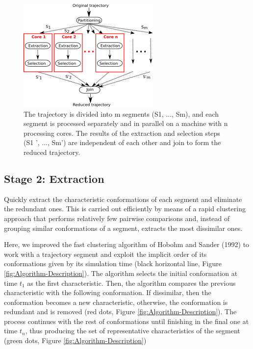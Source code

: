 \documentclass[american,twocolumn]{bmcart}
\begin{document}
\begin{figure}[th]
\begin{centering}
\includegraphics{images/algorithm-description-parallel}
\par\end{centering}
\caption{ The trajectory is divided into m segments (S1, ..., Sm), and each segment is processed separately and in parallel on a machine with n processing cores. The results of the extraction and selection steps (S1 ', ..., Sm') are independent of each other and join to form the reduced trajectory. \label{fig:Algorithm-Parallel}}
\end{figure}


\subsection*{Stage 2: Extraction}

Quickly extract the characteristic conformations of each segment and eliminate the redundant ones. This is carried out efficiently by means of a rapid clustering approach that performs relatively few pairwise comparisons and, instead of grouping similar conformations of a segment, extracts the most dissimilar ones.

Here, we improved the fast clustering algorithm of Hobohm and Sander (1992) to work with a trajectory segment and exploit the implicit order of its conformations given by its simulation time (black horizontal line, Figure \ref{fig:Algorithm-Description}). The algorithm selects the initial conformation at time $t_1$ as the first characteristic. Then, the algorithm compares the previous characteristic with the following conformation. If dissimilar, then the conformation becomes a new characteristic, otherwise, the conformation is redundant and is removed (red dots, Figure \ref{fig:Algorithm-Description}). The process continues with the rest of conformations until finishing in the final one at time $t_n$, thus producing the set of representative characteristics of the segment (green dots, Figure \ref{fig:Algorithm-Description})
\end{document}
